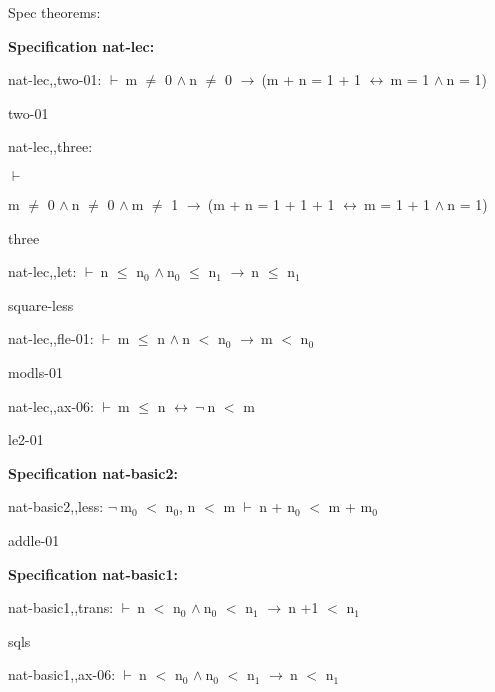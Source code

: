 \documentclass[a4paper]{article}
\newcommand{\Fol}{\mbox{$\vdash\ $}}
\newcommand{\Not}{\mbox{$\neg\ $}}
\newcommand{\And}{\mbox{$\wedge\ $}}
\newcommand{\Imp}{\mbox{$\rightarrow\ $}}
\newcommand{\Equiv}{\mbox{$\leftrightarrow\ $}}
\begin{document}
\raggedright
              
Spec theorems: 


{\bf Specification nat-lec:}

nat-lec,,two-01: 
 \Fol m $\neq$ 0 \And n $\neq$ 0 \Imp (m + n = 1 + 1 \Equiv m = 1 \And n = 1)



two-01

\bigskip

nat-lec,,three: 
\begin{flushleft}


\Fol

m $\neq$ 0 \And n $\neq$ 0 \And m $\neq$ 1 \Imp (m + n = 1 + 1 + 1 \Equiv m = 1 + 1 \And n = 1)

\end{flushleft}



three

\bigskip

nat-lec,,let: 
 \Fol n $\le$ $\mbox{n}_{0}$ \And $\mbox{n}_{0}$ $\le$ $\mbox{n}_{1}$ \Imp n $\le$ $\mbox{n}_{1}$



square-less

\bigskip

nat-lec,,fle-01: 
 \Fol m $\le$ n \And n $<$ $\mbox{n}_{0}$ \Imp m $<$ $\mbox{n}_{0}$



modls-01

\bigskip

nat-lec,,ax-06: 
 \Fol m $\le$ n \Equiv \Not n $<$ m



le2-01

\bigskip

{\bf Specification nat-basic2:}

nat-basic2,,less: 
\Not $\mbox{m}_{0}$ $<$ $\mbox{n}_{0}$, 
n $<$ m
 \Fol n + $\mbox{n}_{0}$ $<$ m + $\mbox{m}_{0}$



addle-01

\bigskip

{\bf Specification nat-basic1:}

nat-basic1,,trans: 
 \Fol n $<$ $\mbox{n}_{0}$ \And $\mbox{n}_{0}$ $<$ $\mbox{n}_{1}$ \Imp n +1 $<$ $\mbox{n}_{1}$



sqls

\bigskip

nat-basic1,,ax-06: 
 \Fol n $<$ $\mbox{n}_{0}$ \And $\mbox{n}_{0}$ $<$ $\mbox{n}_{1}$ \Imp n $<$ $\mbox{n}_{1}$
\end{document}
